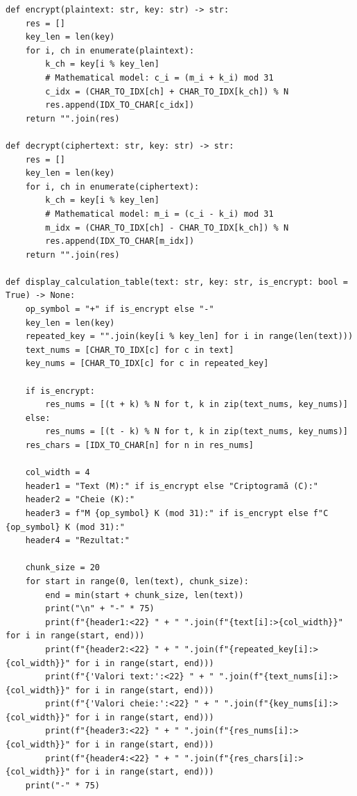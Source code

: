 \documentclass[11pt,a4paper]{article}
\begin{document}
\begin{lstlisting}[style=pythoncode,caption={Cryptographic engine and calculation table generator},label={lst:cipher_engine}]
def encrypt(plaintext: str, key: str) -> str:
    res = []
    key_len = len(key)
    for i, ch in enumerate(plaintext):
        k_ch = key[i % key_len]
        # Mathematical model: c_i = (m_i + k_i) mod 31
        c_idx = (CHAR_TO_IDX[ch] + CHAR_TO_IDX[k_ch]) % N
        res.append(IDX_TO_CHAR[c_idx])
    return "".join(res)

def decrypt(ciphertext: str, key: str) -> str:
    res = []
    key_len = len(key)
    for i, ch in enumerate(ciphertext):
        k_ch = key[i % key_len]
        # Mathematical model: m_i = (c_i - k_i) mod 31
        m_idx = (CHAR_TO_IDX[ch] - CHAR_TO_IDX[k_ch]) % N
        res.append(IDX_TO_CHAR[m_idx])
    return "".join(res)

def display_calculation_table(text: str, key: str, is_encrypt: bool = True) -> None:
    op_symbol = "+" if is_encrypt else "-"
    key_len = len(key)
    repeated_key = "".join(key[i % key_len] for i in range(len(text)))
    text_nums = [CHAR_TO_IDX[c] for c in text]
    key_nums = [CHAR_TO_IDX[c] for c in repeated_key]
    
    if is_encrypt:
        res_nums = [(t + k) % N for t, k in zip(text_nums, key_nums)]
    else:
        res_nums = [(t - k) % N for t, k in zip(text_nums, key_nums)]
    res_chars = [IDX_TO_CHAR[n] for n in res_nums]
    
    col_width = 4
    header1 = "Text (M):" if is_encrypt else "Criptogramă (C):"
    header2 = "Cheie (K):"
    header3 = f"M {op_symbol} K (mod 31):" if is_encrypt else f"C {op_symbol} K (mod 31):"
    header4 = "Rezultat:"
    
    chunk_size = 20
    for start in range(0, len(text), chunk_size):
        end = min(start + chunk_size, len(text))
        print("\n" + "-" * 75)
        print(f"{header1:<22} " + " ".join(f"{text[i]:>{col_width}}" for i in range(start, end)))
        print(f"{header2:<22} " + " ".join(f"{repeated_key[i]:>{col_width}}" for i in range(start, end)))
        print(f"{'Valori text:':<22} " + " ".join(f"{text_nums[i]:>{col_width}}" for i in range(start, end)))
        print(f"{'Valori cheie:':<22} " + " ".join(f"{key_nums[i]:>{col_width}}" for i in range(start, end)))
        print(f"{header3:<22} " + " ".join(f"{res_nums[i]:>{col_width}}" for i in range(start, end)))
        print(f"{header4:<22} " + " ".join(f"{res_chars[i]:>{col_width}}" for i in range(start, end)))
    print("-" * 75)
\end{lstlisting}
\end{document}
